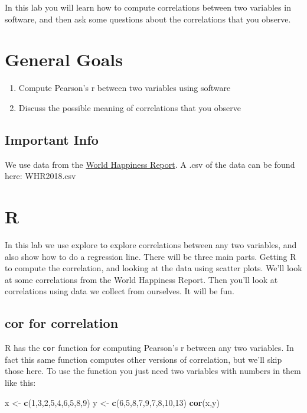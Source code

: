 \documentclass[]{book}
\newenvironment{Shaded}{\begin{snugshade}}{\end{snugshade}}
\newcommand{\KeywordTok}[1]{\textcolor[rgb]{0.13,0.29,0.53}{\textbf{#1}}}
\newcommand{\DecValTok}[1]{\textcolor[rgb]{0.00,0.00,0.81}{#1}}
\newcommand{\StringTok}[1]{\textcolor[rgb]{0.31,0.60,0.02}{#1}}
\newcommand{\NormalTok}[1]{#1}
\providecommand{\tightlist}{%
  \setlength{\itemsep}{0pt}\setlength{\parskip}{0pt}}
\begin{document}
In this lab you will learn how to compute correlations between two
variables in software, and then ask some questions about the
correlations that you observe.

\section{General Goals}\label{general-goals-2}

\begin{enumerate}
\def\labelenumi{\arabic{enumi}.}
\tightlist
\item
  Compute Pearson's r between two variables using software
\item
  Discuss the possible meaning of correlations that you observe
\end{enumerate}

\subsection{Important Info}\label{important-info-2}

We use data from the \href{http://worldhappiness.report}{World Happiness
Report}. A .csv of the data can be found here: WHR2018.csv

\section{R}\label{r-3}

In this lab we use explore to explore correlations between any two
variables, and also show how to do a regression line. There will be
three main parts. Getting R to compute the correlation, and looking at
the data using scatter plots. We'll look at some correlations from the
World Happiness Report. Then you'll look at correlations using data we
collect from ourselves. It will be fun.

\subsection{cor for correlation}\label{cor-for-correlation}

R has the \texttt{cor} function for computing Pearson's r between any
two variables. In fact this same function computes other versions of
correlation, but we'll skip those here. To use the function you just
need two variables with numbers in them like this:

\begin{Shaded}
\begin{Highlighting}[]
\NormalTok{x  <-}\StringTok{ }\KeywordTok{c}\NormalTok{(}\DecValTok{1}\NormalTok{,}\DecValTok{3}\NormalTok{,}\DecValTok{2}\NormalTok{,}\DecValTok{5}\NormalTok{,}\DecValTok{4}\NormalTok{,}\DecValTok{6}\NormalTok{,}\DecValTok{5}\NormalTok{,}\DecValTok{8}\NormalTok{,}\DecValTok{9}\NormalTok{)}
\NormalTok{y  <-}\StringTok{ }\KeywordTok{c}\NormalTok{(}\DecValTok{6}\NormalTok{,}\DecValTok{5}\NormalTok{,}\DecValTok{8}\NormalTok{,}\DecValTok{7}\NormalTok{,}\DecValTok{9}\NormalTok{,}\DecValTok{7}\NormalTok{,}\DecValTok{8}\NormalTok{,}\DecValTok{10}\NormalTok{,}\DecValTok{13}\NormalTok{)}
\KeywordTok{cor}\NormalTok{(x,y)}
\end{Highlighting}
\end{Shaded}
\end{document}
